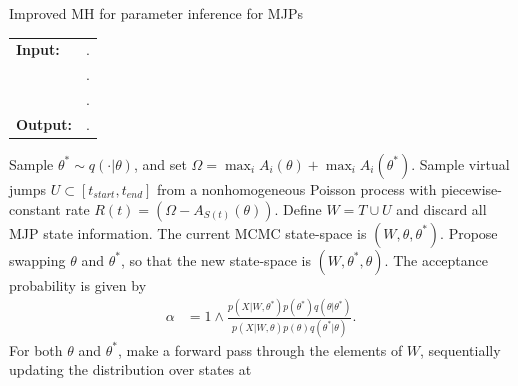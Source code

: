 \begin{algorithm}[H]
   \caption{Improved MH for parameter inference for MJPs }
   \label{alg:MH_improved}
  \begin{tabular}{l l}
   \textbf{Input:  } & \text{A set of partial and noisy observations $X$}. \\
                      & \text{The previous MJP path $S(t) = (S, T)$, the previous MJP parameters $\theta$}.\\ 
                     & \text{A  Metropolis-Hasting proposal $q(\cdot | \theta)$}.\\
   \textbf{Output:  }& \text{A new MJP trajectory $\tilde{S} (t) = (\tilde{S}, \tilde{T})$, 
                            new MJP parameters $\tilde{\theta}$}.\\
   \hline
   \end{tabular}
   \begin{algorithmic}[1]
      \State Sample $\theta^* \sim q(\cdot| \theta)$, and 
      set $\Omega = \max_i A_i(\theta) + \max_i A_i(\theta^*)$. 
    \State Sample virtual jumps $U\subset[t_{start}, t_{end}]$ from a nonhomogeneous Poisson process with 
    piecewise-constant rate $R(t) = (\Omega - A_{S(t)}(\theta))$. 
    Define $W = T \cup U$ and discard all MJP state information.
    \State The current MCMC state-space is $(W,\theta,\theta^*)$. Propose swapping
    $\theta$ and $\theta^*$, so that the new state-space is 
    $(W, \theta^*, \theta)$. The acceptance probability is given by
        \begin{align*}
        \alpha %
        &=  1 \wedge \frac{p(X| W,\theta^*)p(\theta^*)q(\theta|\theta^*)}
        {p(X| W,\theta)p(\theta) q(\theta^*|\theta)}.
        \end{align*}
    \State For both $\theta$ and $\theta^*$, make a forward pass through the 
    elements of $W$, sequentially updating the distribution over states at 

\end{algorithmic}
\end{algorithm}
